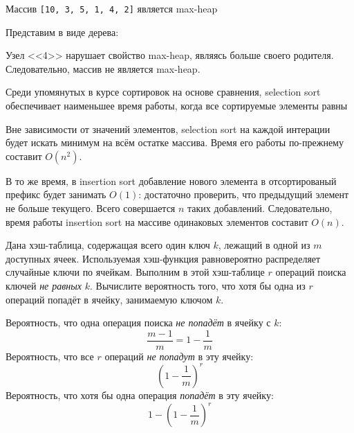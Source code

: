 \documentclass[12pt]{exam}
\begin{document}
\begin{questions}
\begin{checkboxes}
    \choice Массив {\tt [10, 3, 5, 1, 4, 2]} является max-heap
        \begin{solution}
        Представим в виде дерева:
        \begin{center}
        \end{center}
        Узел <<4>> нарушает свойство max-heap, являясь больше своего родителя. Следовательно, массив не является max-heap.
        \end{solution}

    \choice Среди упомянутых в курсе сортировок на основе сравнения, selection sort обеспечивает наименьшее время работы, когда все сортируемые элементы равны
        \begin{solution}
            Вне зависимости от значений элементов, selection sort на каждой интерации будет искать минимум на всём остатке массива. Время его работы по-прежнему составит $O(n^2)$.

            В то же время, в insertion sort добавление нового элемента в отсортированый префикс будет занимать $O(1)$: достаточно проверить, что предыдущий элемент не больше текущего. Всего совершается $n$ таких добавлений. Следовательно, время работы insertion sort на массиве одинаковых элементов составит $O(n)$.
        \end{solution}
    \end{checkboxes}


\question[3] Дана хэш-таблица, содержащая всего один ключ $k$, лежащий в одной из $m$ доступных ячеек. Используемая хэш-функция равновероятно распределяет случайные ключи по ячейкам.
Выполним в этой хэш-таблице $r$ операций поиска ключей {\em не равных} $k$. Вычислите вероятность того, что хотя бы одна из $r$ операций попадёт в ячейку, занимаемую ключом $k$.

\begin{solution}
Вероятность, что одна операция поиска {\it не попадёт} в ячейку с $k$:
$$
\frac{m-1}{m} = 1 - \frac{1}{m}
$$
Вероятность, что все $r$ операций {\it не попадут} в эту ячейку:
$$
\left(1 - \frac{1}{m}\right)^r
$$
Вероятность, что хотя бы одна операция {\it попадёт} в эту ячейку:
$$
1 - \left(1 - \frac{1}{m}\right)^r
$$



\end{solution}
\end{questions}
\end{document}
